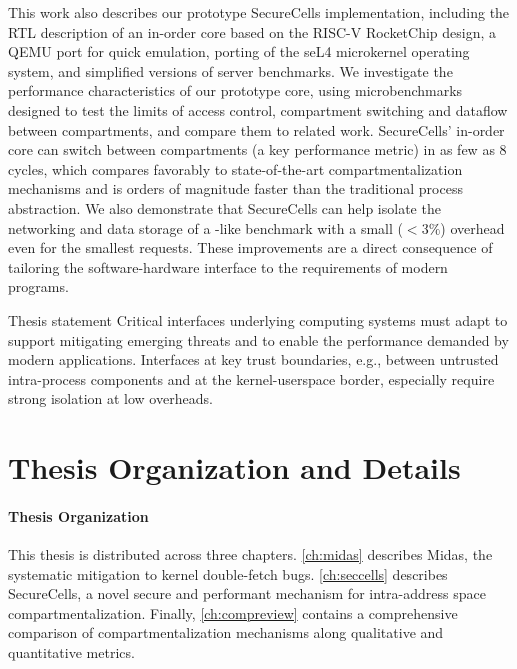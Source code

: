 This work also describes our prototype SecureCells implementation, including
the RTL description of an in-order core based on the RISC-V RocketChip design,
a QEMU port for quick emulation, porting of the seL4 microkernel operating
system, and simplified versions of server benchmarks.
We investigate the performance characteristics of our prototype core, using
microbenchmarks designed to test the limits of access control, compartment 
switching and dataflow between compartments, and compare them to related work.
SecureCells' in-order core can switch between compartments (a key performance
metric) in as few as 8 cycles, which compares favorably to state-of-the-art
compartmentalization mechanisms and is orders of magnitude faster than the
traditional process abstraction.
We also demonstrate that SecureCells can help isolate the networking and
data storage of a -like benchmark with a small ($<3\%$)
overhead even for the smallest requests.
These improvements are a direct consequence of tailoring the software-hardware
interface to the requirements of modern programs.

\begin{thesis}{Thesis statement}
      Critical interfaces underlying computing systems must adapt 
      to support mitigating emerging threats and 
      to enable the performance demanded by modern applications.
      Interfaces at key trust boundaries, e.g.,
      between untrusted intra-process components and 
      at the kernel-userspace border, 
      especially require strong isolation at low overheads.
\end{thesis}


\section{Thesis Organization and Details}

\paragraph{Thesis Organization}
This thesis is distributed across three chapters. 
\autoref{ch:midas} describes Midas, the systematic mitigation to
kernel double-fetch bugs.
\autoref{ch:seccells} describes SecureCells, a novel secure and performant 
mechanism for intra-address space compartmentalization.
Finally, \autoref{ch:compreview} contains a comprehensive comparison of
compartmentalization mechanisms along qualitative and quantitative metrics.

